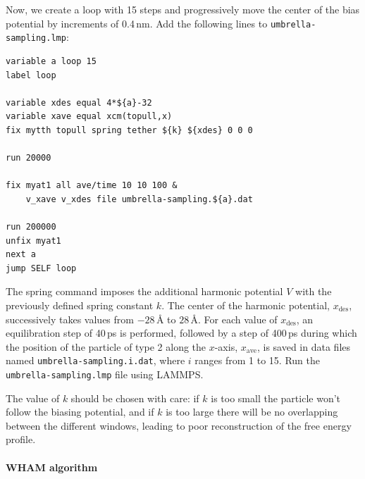 \documentclass[9pt,tutorial]{livecoms}
\newcommand{\lmpcmd}[1]{\hspace{0pt}\colorbox{listing}{\textcolor{command}{\small{#1}}}\hspace{0pt}} %
\newcommand{\flecmd}[1]{\textcolor{command}{\texttt{#1}}} %
\begin{document}
Now, we create a loop with 15 steps and progressively move the center of the
bias potential by increments of 0.4\,nm.  Add the following lines to \flecmd{umbrella-sampling.lmp}:
\begin{lstlisting}
variable a loop 15
label loop

variable xdes equal 4*${a}-32
variable xave equal xcm(topull,x)
fix mytth topull spring tether ${k} ${xdes} 0 0 0

run 20000

fix myat1 all ave/time 10 10 100 &
    v_xave v_xdes file umbrella-sampling.${a}.dat

run 200000
unfix myat1
next a
jump SELF loop
\end{lstlisting}
The \lmpcmd{spring} command imposes the additional harmonic potential $V$ with
the previously defined spring constant $k$.  The center of the harmonic
potential, $x_\text{des}$, successively takes values
from $-28\,\text{\AA{}}$ to $28\,\text{\AA{}}$.  For each value of $x_\text{des}$,
an equilibration step of 40\,ps is performed, followed by a step
of 400\,ps during which the position of the particle of
type 2 along the $x$-axis, $x_\text{ave}$, is saved in data files named \flecmd{umbrella-sampling.i.dat},
where $i$ ranges from 1 to 15.  Run the \flecmd{umbrella-sampling.lmp} file using LAMMPS.

\begin{note}
The value of $k$ should be chosen with care:
if $k$ is too small the particle won't follow the biasing potential,
and if $k$ is too large there will be no overlapping between
the different windows, leading to poor reconstruction of the free energy profile.
\end{note}

\paragraph{WHAM algorithm}
\end{document}
